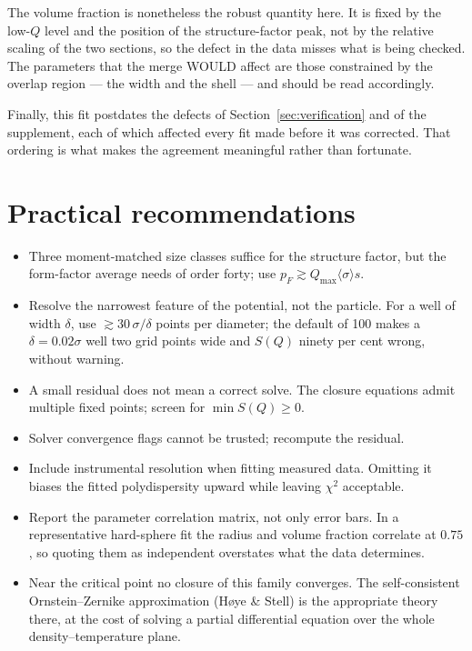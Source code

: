 \documentclass[11pt,a4paper]{article}
\newcommand{\Q}{Q}
\begin{document}
The volume fraction is nonetheless the robust quantity here. It is fixed by
the low-$Q$ level and the position of the structure-factor peak, not by the
relative scaling of the two sections, so the defect in the data misses what
is being checked. The parameters that the merge WOULD affect are those
constrained by the overlap region --- the width and the shell --- and should
be read accordingly.

Finally, this fit postdates the defects of Section~\ref{sec:verification}
and of the supplement, each of which affected every fit made before it was
corrected. That ordering is what makes the agreement meaningful rather than
fortunate.

\section{Practical recommendations}

\begin{itemize}\itemsep2pt
\item Three moment-matched size classes suffice for the structure factor, but
the form-factor average needs of order forty; use
$p_F \gtrsim \Q_{\max}\langle\sigma\rangle s$.
\item Resolve the narrowest feature of the potential, not the particle. For a
well of width $\delta$, use $\gtrsim 30\,\sigma/\delta$ points per diameter;
the default of 100 makes a $\delta = 0.02\sigma$ well two grid points wide and
$S(\Q)$ ninety per cent wrong, without warning.
\item A small residual does not mean a correct solve. The closure equations
admit multiple fixed points; screen for $\min S(\Q) \ge 0$.
\item Solver convergence flags cannot be trusted; recompute the residual.
\item Include instrumental resolution when fitting measured data. Omitting it
biases the fitted polydispersity upward while leaving $\chi^2$ acceptable.
\item Report the parameter correlation matrix, not only error bars. In a
representative hard-sphere fit the radius and volume fraction correlate at
$0.75$, so quoting them as independent overstates what the data determines.
\item Near the critical point no closure of this family converges. The
self-consistent Ornstein--Zernike approximation (H\o ye \& Stell) is the
appropriate theory there, at the cost of solving a partial differential
equation over the whole density--temperature plane.
\end{itemize}
\end{document}
